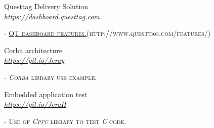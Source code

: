 \documentclass[10pt]{article} %
\begin{document}
{\begin{minipage}[t]{0.5\textwidth}


{\raggedright\large Questtag Delivery Solution\\
\textit{\href{https://dashboard.questtag.com}{https://dashboard.questtag.com}}\\[2pt]
}

\textsc{- \href{http://www.questtag.com/features/}{QT dashboard features.}(http://www.questtag.com/features/)}\\



%
%





{\raggedright\large Corba architecture \\
	\textit{\href {https://github.com/Bitaron/Corba}{https://git.io/Jeray}}\\[5pt]}
\textsc{- \textit{Corba} library use example.}\\




{\raggedright\large Embedded application test \\
	\textit{\href {https://github.com/Bitaron/C}{https://git.io/JeraH}}\\[5pt]}
\textsc{- Use of \textit{Cppu} library to test \textit{C} code.}\\



%





\end{minipage}}
\end{document}
